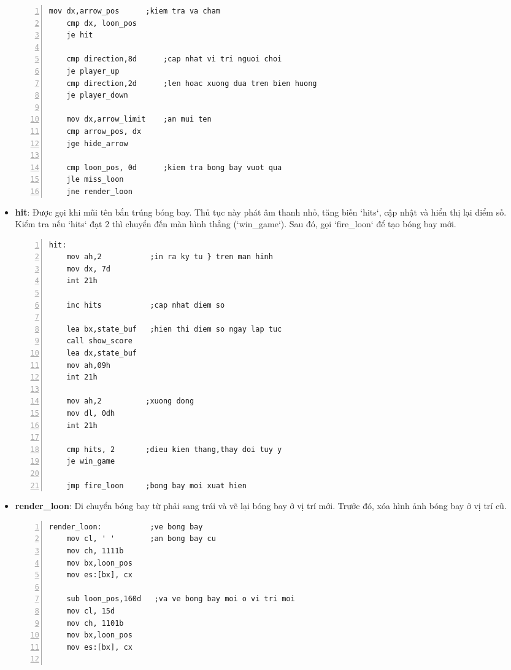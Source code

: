 \documentclass[12pt,a4paper,openany,oneside]{report}
\begin{document}
\begin{itemize}
\begin{lstlisting}[caption={Mã nguồn nhãn inside_loop}, basicstyle=\ttfamily\footnotesize, numbers=left, numberstyle=\tiny, stepnumber=1, numbersep=5pt, breaklines=true, language={[x86masm]Assembler}]
    mov dx,arrow_pos      ;kiem tra va cham
    cmp dx, loon_pos
    je hit
        
    cmp direction,8d      ;cap nhat vi tri nguoi choi
    je player_up
    cmp direction,2d      ;len hoac xuong dua tren bien huong
    je player_down
        
    mov dx,arrow_limit    ;an mui ten 
    cmp arrow_pos, dx
    jge hide_arrow
        
    cmp loon_pos, 0d      ;kiem tra bong bay vuot qua
    jle miss_loon
    jne render_loon 
\end{lstlisting} 
    \item \textbf{hit}: Được gọi khi mũi tên bắn trúng bóng bay. Thủ tục này phát âm thanh nhỏ, tăng biến `hits`, cập nhật và hiển thị lại điểm số. Kiểm tra nếu `hits` đạt 2 thì chuyển đến màn hình thắng (`win_game`). Sau đó, gọi `fire_loon` để tạo bóng bay mới.
\begin{lstlisting}[caption={Mã nguồn nhãn hit}, basicstyle=\ttfamily\footnotesize, numbers=left, numberstyle=\tiny, stepnumber=1, numbersep=5pt, breaklines=true, language={[x86masm]Assembler}]
hit:                 
    mov ah,2           ;in ra ky tu } tren man hinh
    mov dx, 7d
    int 21h 
            
    inc hits           ;cap nhat diem so

    lea bx,state_buf   ;hien thi diem so ngay lap tuc
    call show_score 
    lea dx,state_buf
    mov ah,09h
    int 21h

    mov ah,2          ;xuong dong
    mov dl, 0dh
    int 21h

    cmp hits, 2       ;dieu kien thang,thay doi tuy y
    je win_game

    jmp fire_loon     ;bong bay moi xuat hien
\end{lstlisting} 
    \item \textbf{render\_loon}: Di chuyển bóng bay từ phải sang trái và vẽ lại bóng bay ở vị trí mới. Trước đó, xóa hình ảnh bóng bay ở vị trí cũ.
\begin{lstlisting}[caption={Mã nguồn nhãn render_loon}, basicstyle=\ttfamily\footnotesize, numbers=left, numberstyle=\tiny, stepnumber=1, numbersep=5pt, breaklines=true, language={[x86masm]Assembler}]
render_loon:           ;ve bong bay
    mov cl, ' '        ;an bong bay cu
    mov ch, 1111b
    mov bx,loon_pos 
    mov es:[bx], cx
                
    sub loon_pos,160d   ;va ve bong bay moi o vi tri moi
    mov cl, 15d
    mov ch, 1101b
    mov bx,loon_pos 
    mov es:[bx], cx
            

\end{lstlisting}
\end{itemize}
\end{document}
